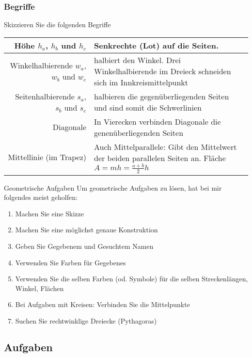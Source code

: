 \newpage
\subsubsection{Begriffe}

Skizzieren Sie die folgenden Begriffe

\begin{tabular}{rp{90mm}}
  Höhe $h_a$, $h_b$ und $h_c$ & Senkrechte (Lot) auf die Seiten.\\\hline
  
  Winkelhalbierende $w_a$, $w_b$ und $w_c$ & halbiert den Winkel. Drei
    Winkelhalbierende im Dreieck schneiden sich im Innkreismittelpunkt\\\hline

    Seitenhalbierende $s_a$, $s_b$ und $s_c$ & halbieren die
  gegenüberliegenden Seiten und sind somit die
  Schwerlinien\index{Schwerlinie}\\\hline
  
  Diagonale & In Vierecken verbinden Diagonale die genenüberliegenden
  Seiten\\\hline

  Mittellinie (im Trapez) & Auch Mittelparallele: Gibt den Mittelwert
  der beiden parallelen Seiten an. Fläche $A = mh = \frac{a+b}2h$
\end{tabular}

\TNTeop{}
\newpage

\begin{rezept}{Geometrische Aufgaben}{}
Um geometrische Aufgaben zu lösen, hat bei mir folgendes meist geholfen:

\begin{enumerate}
\item Machen Sie eine Skizze
\item Machen Sie eine möglichst genaue Konstruktion
\item Geben Sie Gegebenem und Gesuchtem Namen
\item Verwenden Sie Farben für Gegebenes
\item Verwenden Sie die selben Farben (od. Symbole) für die selben Streckenlängen, Winkel, Flächen
\item Bei Aufgaben mit Kreisen: Verbinden Sie die Mittelpunkte 
\item Suchen Sie rechtwinklige Dreiecke (Pythagoras)

\end{enumerate}
\end{rezept}


\subsection*{Aufgaben}

